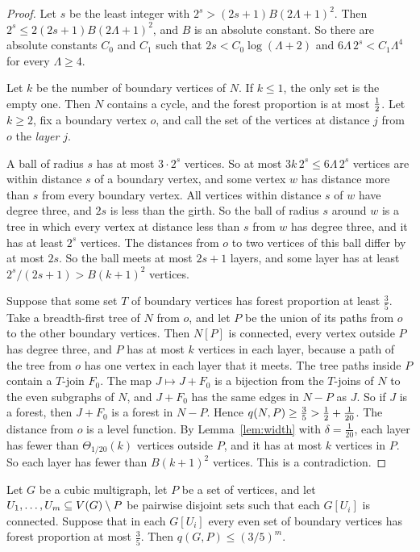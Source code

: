 \begin{proof}
Let $s$ be the least integer with $2^{s}>(2s+1)B(2\Lambda+1)^{2}$. Then
$2^{s}\le2(2s+1)B(2\Lambda+1)^{2}$, and $B$ is an absolute constant. So there are absolute
constants $C_0$ and $C_1$ such that $2s<C_0\log(\Lambda+2)$ and $6\Lambda\,2^{s}<C_1\Lambda^{4}$
for every $\Lambda\ge4$.

Let $k$ be the number of boundary vertices of $N$. If $k\le1$, the only set is the empty one.
Then $N$ contains a cycle, and the forest proportion is at most $\tfrac12$. Let $k\ge2$, fix a
boundary vertex $o$, and call the set of the vertices at distance $j$ from $o$ the \emph{layer}
$j$.

 A ball of radius $s$ has at most $3\cdot2^{s}$ vertices. So at most
$3k\,2^{s}\le6\Lambda\,2^{s}$ vertices are within distance $s$ of a boundary vertex, and some
vertex $w$ has distance more than $s$ from every boundary vertex. All vertices within distance
$s$ of $w$ have degree three, and $2s$ is less than the girth. So the ball of radius $s$ around
$w$ is a tree in which every vertex at distance less than $s$ from $w$ has degree three, and it
has at least $2^{s}$ vertices. The distances from $o$ to two vertices of this ball differ by at
most $2s$. So the ball meets at most $2s+1$ layers, and some layer has at least
$2^{s}/(2s+1)>B(k+1)^{2}$ vertices.

 Suppose that some set $T$ of boundary vertices has forest proportion at least
$\frac35$. Take a breadth-first tree of $N$ from $o$, and let $P$ be the union of its paths from
$o$ to the other boundary vertices. Then $N[P]$ is connected, every vertex outside $P$ has degree
three, and $P$ has at most $k$ vertices in each layer, because a path of the tree from $o$ has
one vertex in each layer that it meets. The tree paths inside $P$ contain a $T$-join $F_0$. The
map $J\mapsto J+F_0$ is a bijection from the $T$-joins of $N$ to the even subgraphs of $N$, and
$J+F_0$ has the same edges in $N-P$ as $J$. So if $J$ is a forest, then $J+F_0$ is a forest in
$N-P$. Hence $q(N,P)\ge\frac35>\tfrac12+\frac1{20}$. The distance from $o$ is a level function. By
Lemma~\ref{lem:width} with $\delta=\frac1{20}$, each layer has fewer than $\Theta_{1/20}(k)$
vertices outside $P$, and it has at most $k$ vertices in $P$. So each layer has fewer than
$B(k+1)^{2}$ vertices. This is a contradiction.
\end{proof}

\begin{lemma}[Product]\label{lem:product}
Let $G$ be a cubic multigraph, let $P$ be a set of vertices, and let
$U_1,\ldots,U_m\subseteq V(G)\setminus P$ be pairwise disjoint sets such that each $G[U_i]$ is
connected. Suppose that in each $G[U_i]$ every even set of boundary vertices has forest
proportion at most $\frac35$. Then $q(G,P)\le(3/5)^m$.
\end{lemma}


